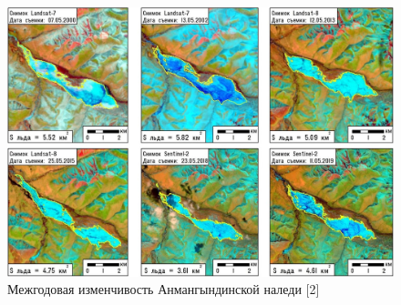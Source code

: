 \begin{figure}[h!]
\begin{changemargin}{-1.25cm}{0cm}
  \begin{center}
    \includegraphics[width=1.2\textwidth]{authors/zemlaykova-1-fig-1.jpg}
  \end{center}
\end{changemargin}
  \caption{Межгодовая изменчивость Анмангындинской наледи [2]}
  \label{fig:zemlaykova-1-fig-1}
\end{figure}
